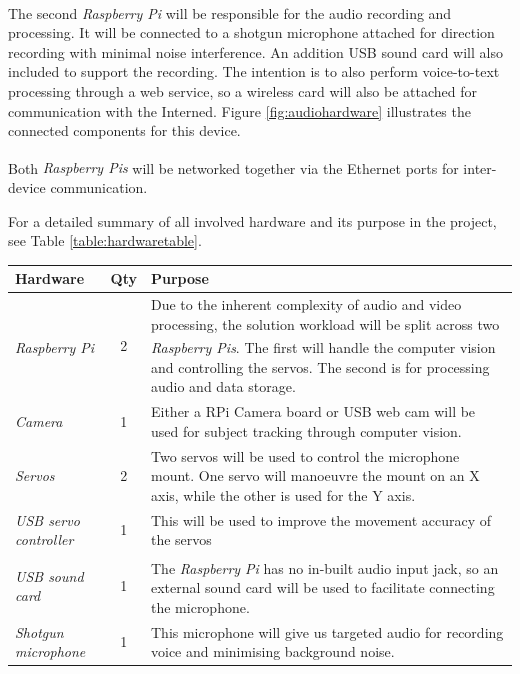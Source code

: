 \documentclass[11pt,a4paper,titlepage]{report}
\newcommand{\rpi}{\textit{Raspberry Pi\textsuperscript{\textregistered}}}
\newcommand{\rpis}{\textit{Raspberry Pi\textsuperscript{\textregistered}s}}
\begin{document}
The second \rpi\xspace will be responsible for the audio recording and processing. It will be connected to a shotgun microphone attached for direction recording with minimal noise interference. An addition USB sound card will also included to support the recording. The intention is to also perform voice-to-text processing through a web service, so a wireless card will also be attached for communication with the Interned. Figure \ref{fig:audiohardware} illustrates the connected components for this device.

Both \rpis\xspace will be networked together via the Ethernet ports for inter-device communication.

For a detailed summary of all involved hardware and its purpose in the project, see Table \ref{table:hardwaretable}. 


\begin{center}
\begin{table}
{\tabulinesep=2mm
\begin{tabu}{ lcp{7cm} }

    \textbf{Hardware} & \textbf{Qty} & \textbf{Purpose} \\ \hline
    
    \rpi & 2 & Due to the inherent complexity of audio and video processing, the solution workload will be split across two \rpis. The first will handle the computer vision and controlling the servos. The second is for processing audio and data storage.\\ 

    \textit{Camera} & 1 & Either a RPi Camera board or USB web cam will be used for subject tracking through computer vision. \\ 
    
   \textit{Servos} & 2 & Two servos will be used to control the microphone mount. One servo will manoeuvre the mount on an X axis, while the other is used for the Y axis. \\ 
        
    \textit{USB servo controller} & 1 & This will be used to improve the movement accuracy of the servos \\ 
    
    \textit{USB sound card} & 1 & The \rpi\xspace has no in-built audio input jack, so an external sound card will be used to facilitate connecting the microphone. \\ 
    
    \textit{Shotgun microphone} & 1 & This microphone will give us targeted audio for recording voice and minimising background noise. \\ 
    

\end{tabu}}
\end{table}
\end{center}
\end{document}
